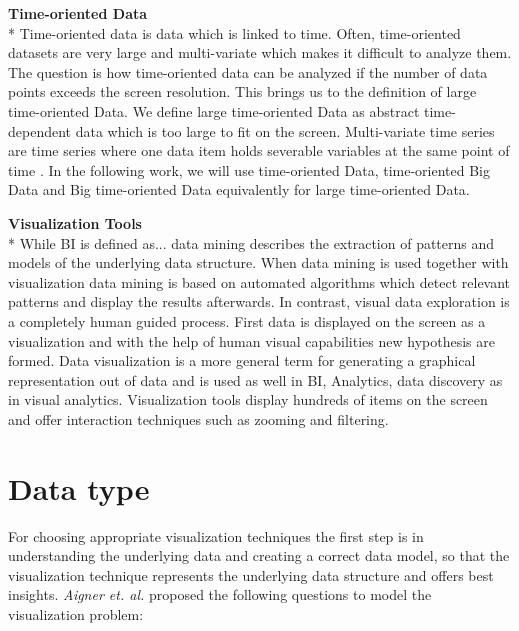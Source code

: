 \textbf{Time-oriented Data}\\*
Time-oriented data is data which is linked to time\cite{Aigner2011}. Often, time-oriented datasets are very large and multi-variate which makes it difficult to analyze them. The question is how time-oriented data can be analyzed if the number of data points exceeds the screen resolution. This brings us to the definition of large time-oriented Data. 
We define large time-oriented Data as abstract time-dependent data which is too large to fit on the screen. \cite{Shneiderman2008} Multi-variate time series are time series where one data item holds severable variables at the same point of time \cite{Aigner2011}.
In the following work, we will use time-oriented Data, time-oriented Big Data and Big time-oriented Data equivalently for large time-oriented Data. 




\textbf{Visualization Tools}\\*
While BI is defined as... data mining describes the extraction of patterns and models of the underlying data structure\cite{FerreiradeOliveira2003}. When data mining is used together with visualization data mining is based on automated algorithms which detect relevant patterns and display the results afterwards. In contrast, visual data exploration is a completely human guided process\cite{FerreiradeOliveira2003}. First data is displayed on the screen as a visualization and with the help of human visual capabilities new hypothesis are formed. Data visualization is a more general term for generating a graphical representation out of data and is used as well in BI, Analytics, data discovery as in visual analytics. 
Visualization tools display hundreds of items on the screen and offer interaction techniques such as zooming and filtering\cite{Shneiderman2008}.


\section{Data type} \label{data}

For choosing appropriate visualization techniques the first step is in understanding the underlying data and creating a correct data model\cite{Aigner2011}, so that the visualization technique represents the underlying data structure and offers best insights\cite{Bacic}. \textit{Aigner et. al.} proposed  the following questions to model the visualization problem: 

